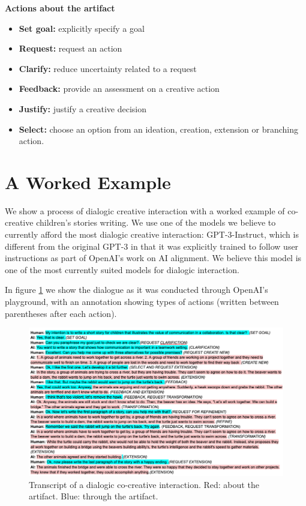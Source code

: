 \documentclass[acmlarge, nonacm, screen]{acmart} %
\begin{document}
  \textbf{Actions about the artifact}
  
\begin{itemize}
  \item \relax \textbf{Set goal:} explicitly specify a goal
  \item \relax \textbf{Request:} request an action
  \item \relax \textbf{Clarify:} reduce uncertainty related to a request
  \item \relax \textbf{Feedback:} provide an assessment on a creative action
  \item \relax \textbf{Justify:} justify a creative decision
  \item \relax \textbf{Select:} choose an option from an ideation, creation, extension or branching action.
\end{itemize}

\section{A Worked Example}
We show a process of dialogic creative interaction with a worked example of co-creative children's stories writing. We use one of the models we believe to currently afford the most dialogic creative interaction: GPT-3-Instruct, which is different from the original GPT-3 in that it was explicitly trained to follow user instructions as part of OpenAI's work on AI alignment. We believe this model is one of the most currently suited models for dialogic interaction.

In figure \ref{fig:transcript} we show the dialogue as it was conducted through OpenAI's playground, with an annotation showing types of actions (written between parentheses after each action).

\begin{figure}
  \includegraphics[width=\linewidth]{./TRANSCRIPT.png}
  \caption{Transcript of a dialogic co-creative interaction. Red: about the artifact. Blue: through the artifact.}
  \label{fig:transcript}
\end{figure}
\end{document}
